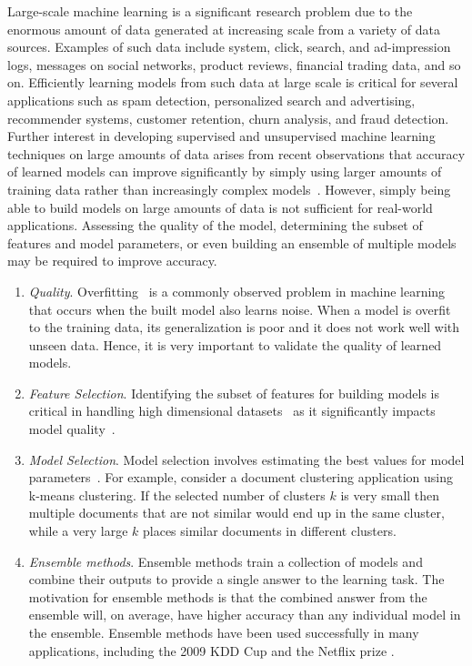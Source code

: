 \documentclass{vldb}
\begin{document}
Large-scale machine learning is a significant research problem due to the enormous amount of data
generated at increasing scale from a variety of data sources. Examples of such data include system,
click, search, and ad-impression logs, messages on social networks, product reviews, financial
trading data, and so on.  Efficiently learning models from such data at large scale is critical for
several applications such as spam detection, personalized search and advertising, recommender
systems, customer retention, churn analysis, and fraud detection. Further interest in developing
supervised and unsupervised machine learning techniques on large amounts of data arises from recent
observations that accuracy of learned models can improve significantly by simply using larger
amounts of training data rather than increasingly complex
models~\cite{DBLP:journals/expert/HalevyNP09}.  However, simply being able to build models on large
amounts of data is not sufficient for real-world applications. Assessing the quality of the model,
determining the subset of features and model parameters, or even building an ensemble of multiple
models may be required to improve accuracy.

\begin{enumerate}

\item \emph{Quality}. Overfitting~\cite{Kohavi95featuresubset} is a commonly observed
problem in machine learning that occurs when the built model also learns noise.
When a model is overfit to the training data, its generalization is poor and it does
not work well with unseen data. Hence, it is very important to validate the quality of learned models.

\item \emph{Feature Selection}.
Identifying the subset of features for building models is critical
in handling high dimensional datasets~\cite{Kriegel:2009:CHD:1497577.1497578}
as it significantly impacts model quality~\cite{DBLP:journals/jmlr/GuyonE03}.

\item \emph{Model Selection}.
Model selection involves estimating the best values for model parameters~\cite{Scheffer/Joachims/99a}.
For example, consider a document clustering application using k-means clustering.
If the selected number of clusters $k$ is very small then multiple documents that
are not similar would end up in the same cluster, while a very large $k$ places
similar documents in different clusters.

\item \emph{Ensemble methods}.
Ensemble methods train a collection of models and combine their outputs to
provide a single answer to the learning task.
The motivation for ensemble methods is that the combined answer from the
ensemble will, on average, have higher accuracy than any individual model
in the ensemble. Ensemble methods have been used successfully in many applications,
including the 2009 KDD Cup \cite{kddcup} and the Netflix prize \cite{netflix}.
\end{enumerate}
\end{document}
